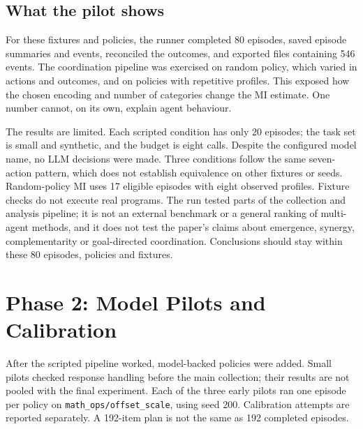 \documentclass[12pt,a4paper,oneside]{report}
\begin{document}
\section{What the pilot shows}
For these fixtures and policies, the runner completed 80 episodes, saved episode summaries and events, reconciled the outcomes, and exported files containing 546 events. The coordination pipeline was exercised on random policy, which varied in actions and outcomes, and on policies with repetitive profiles. This exposed how the chosen encoding and number of categories change the MI estimate. One number cannot, on its own, explain agent behaviour.

The results are limited. Each scripted condition has only 20 episodes; the task set is small and synthetic, and the budget is eight calls. Despite the configured model name, no LLM decisions were made. Three conditions follow the same seven-action pattern, which does not establish equivalence on other fixtures or seeds. Random-policy MI uses 17 eligible episodes with eight observed profiles. Fixture checks do not execute real programs. The run tested parts of the collection and analysis pipeline; it is not an external benchmark or a general ranking of multi-agent methods, and it does not test the paper’s claims about emergence, synergy, complementarity or goal-directed coordination. Conclusions should stay within these 80 episodes, policies and fixtures.

\chapter{Phase 2: Model Pilots and Calibration}
\label{chapter-08}
\thispagestyle{plain}
After the scripted pipeline worked, model-backed policies were added. Small pilots checked response handling before the main collection; their results are not pooled with the final experiment. Each of the three early pilots ran one episode per policy on \texttt{math\allowbreak\_ops/offset\allowbreak\_scale}, using seed 200. Calibration attempts are reported separately. A 192-item plan is not the same as 192 completed episodes.
\end{document}
